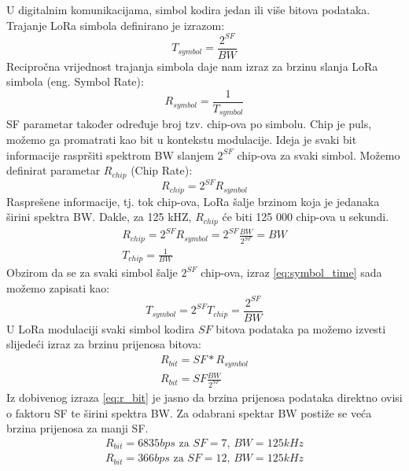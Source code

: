\vspace{10px}
\noindent
U digitalnim komunikacijama, simbol kodira jedan ili više bitova podataka. Trajanje LoRa simbola definirano je izrazom:
\begin{equation}
  T_{symbol} = \frac{2^{SF}}{BW}
  \label{eq:symbol_time}
\end{equation}
Recipročna vrijednost trajanja simbola daje nam izraz za brzinu slanja LoRa simbola (eng. Symbol Rate):
\begin{equation}
 R_{symbol} = \frac{1}{T_{symbol}}
 \label{eq:symbol_rate}
\end{equation}
SF parametar također određuje broj tzv. chip-ova po simbolu.
Chip je puls, možemo ga promatrati kao bit u kontekstu modulacije. Ideja je svaki bit informacije raspršiti spektrom BW slanjem $2^{SF}$ chip-ova za svaki simbol.
Možemo definirat parametar $R_{chip}$ (Chip Rate):
\begin{equation}
R_{chip} = 2^{SF} R_{symbol}
\end{equation}
Rasprešene informacije, tj. tok chip-ova, LoRa šalje brzinom koja je jedanaka širini spektra BW. Dakle, za 125 kHZ, $R_{chip}$ će biti 125 000 chip-ova u sekundi.
\begin{equation}
\begin{gathered}
R_{chip} = 2^{SF} R_{symbol} = 2^{SF} \frac{BW}{2^{SF}} = BW
\\
T_{chip} = \frac{1}{BW}
\end{gathered}
\end{equation}
Obzirom da se za svaki simbol šalje $2^{SF}$ chip-ova, izraz \ref{eq:symbol_time} sada možemo zapisati kao:
\begin{equation}
T_{symbol} = 2^{SF} T_{chip} = \frac{2^{SF}}{BW}
\end{equation}
U LoRa modulaciji svaki simbol kodira $SF$ bitova podataka pa možemo izvesti slijedeći izraz za brzinu prijenosa bitova:
\begin{equation}
\begin{gathered}
R_{bit} = {SF} * R_{symbol}
\\
R_{bit} = SF \frac{BW}{2^{SF}}
\end{gathered}
\label{eq:r_bit}
\end{equation}
Iz dobivenog izraza \ref{eq:r_bit} je jasno da brzina prijenosa podataka direktno ovisi o faktoru SF te širini spektra BW. Za odabrani spektar BW postiže se veća brzina prijenosa za manji SF.
\begin{equation}
\begin{gathered}
R_{bit} = 6835 bps \text{ za } SF = 7\text{, }  BW = 125 kHz
\\
R_{bit} = 366 bps \text{ za } SF = 12\text{, } BW = 125 kHz
\end{gathered}
\end{equation}

